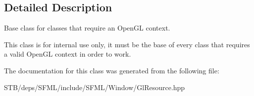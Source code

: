 \subsection{Detailed Description}
Base class for classes that require an Open\+G\+L context. 

This class is for internal use only, it must be the base of every class that requires a valid Open\+G\+L context in order to work. 

The documentation for this class was generated from the following file\+:\begin{DoxyCompactItemize}
\item 
S\+T\+B/deps/\+S\+F\+M\+L/include/\+S\+F\+M\+L/\+Window/Gl\+Resource.\+hpp\end{DoxyCompactItemize}

